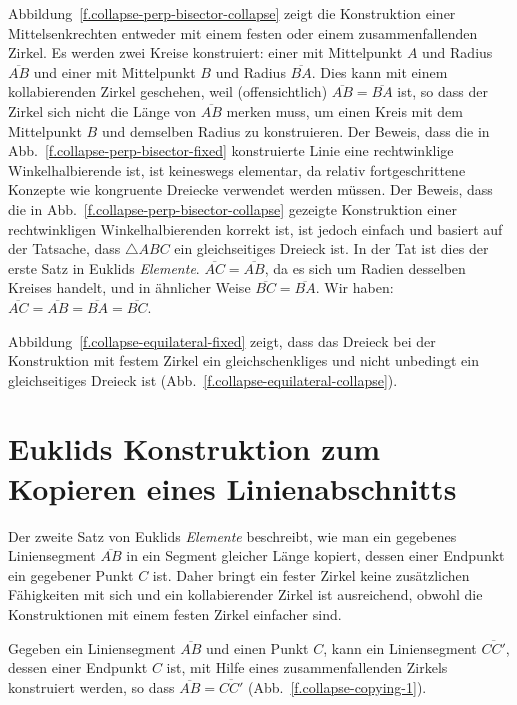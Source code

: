 Abbildung~\ref{f.collapse-perp-bisector-collapse} zeigt die Konstruktion einer Mittelsenkrechten entweder mit einem festen oder einem zusammenfallenden Zirkel. Es werden zwei Kreise konstruiert: einer mit Mittelpunkt $A$ und Radius $\overline{AB}$ und einer mit Mittelpunkt $B$ und Radius $\overline {BA}$. Dies kann mit einem kollabierenden Zirkel geschehen, weil (offensichtlich) $\overline{AB}=\overline{BA}$ ist, so dass der Zirkel sich nicht die Länge von $\overline{AB}$ merken muss, um einen Kreis mit dem Mittelpunkt $B$ und demselben Radius zu konstruieren.
Der Beweis, dass die in Abb.~\ref{f.collapse-perp-bisector-fixed} konstruierte Linie eine rechtwinklige Winkelhalbierende ist, ist keineswegs elementar, da relativ fortgeschrittene Konzepte wie kongruente Dreiecke verwendet werden müssen. Der Beweis, dass die in Abb.~\ref{f.collapse-perp-bisector-collapse} gezeigte Konstruktion einer rechtwinkligen Winkelhalbierenden korrekt ist, ist jedoch einfach und basiert auf der Tatsache, dass $\triangle ABC$ ein gleichseitiges Dreieck ist. In der Tat ist dies der erste Satz in Euklids \textit{Elemente}.
$\overline{AC}=\overline{AB}$, da es sich um Radien desselben Kreises handelt, und in ähnlicher Weise $\overline{BC}=\overline{BA}$. Wir haben: $
\overline{AC}=\overline{AB}=\overline{BA}=\overline{BC}$.

Abbildung~\ref{f.collapse-equilateral-fixed} zeigt, dass das Dreieck bei der Konstruktion mit festem Zirkel ein gleichschenkliges und nicht unbedingt ein gleichseitiges Dreieck ist  (Abb.~\ref{f.collapse-equilateral-collapse}).

\section{Euklids Konstruktion zum Kopieren eines Linienabschnitts}\label{s.collapse-copy}

Der zweite Satz von Euklids \textit{Elemente} beschreibt, wie man ein gegebenes Liniensegment $\overline{AB}$ in ein Segment gleicher Länge kopiert, dessen einer Endpunkt ein gegebener Punkt $C$ ist. Daher bringt ein fester Zirkel keine zusätzlichen Fähigkeiten mit sich und ein kollabierender Zirkel ist ausreichend, obwohl die Konstruktionen mit einem festen Zirkel einfacher sind.

\begin{theorem}
Gegeben ein Liniensegment $\overline{AB}$ und einen Punkt $C$, kann ein Liniensegment $\overline{CC'}$, dessen einer Endpunkt $C$ ist, mit Hilfe eines zusammenfallenden Zirkels konstruiert werden, so dass $\overline{AB}=\overline{CC'}$ (Abb.~\ref{f.collapse-copying-1}).
\end{theorem}

